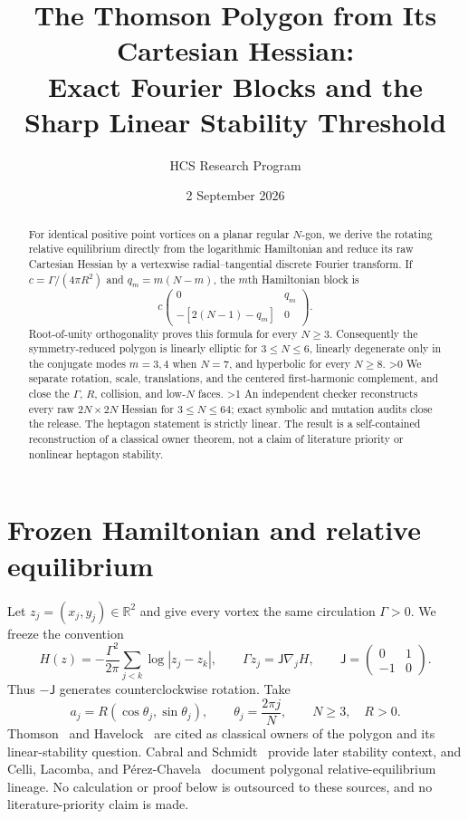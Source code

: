 \documentclass[10pt]{article}
\title{The Thomson Polygon from Its Cartesian Hessian:\\
Exact Fourier Blocks and the Sharp Linear Stability Threshold}
\author{HCS Research Program}
\date{2 September 2026}
\providecommand{\CRevisionRound}{2}
\newcommand{\R}{\mathbb R}
\newcommand{\J}{\mathsf J}
\begin{document}
\maketitle

\begin{abstract}
For identical positive point vortices on a planar regular $N$-gon, we derive
the rotating relative equilibrium directly from the logarithmic Hamiltonian
and reduce its raw Cartesian Hessian by a vertexwise radial--tangential
discrete Fourier transform.  If
$c=\Gamma/(4\pi R^2)$ and $q_m=m(N-m)$, the $m$th Hamiltonian block is
\[
 c\begin{pmatrix}0&q_m\\-[2(N-1)-q_m]&0\end{pmatrix}.
\]
Root-of-unity orthogonality proves this formula for every $N\ge3$.
Consequently the symmetry-reduced polygon is linearly elliptic for
$3\le N\le6$, linearly degenerate only in the conjugate modes $m=3,4$ when
$N=7$, and hyperbolic for every $N\ge8$.
\ifnum\CRevisionRound>0
We separate rotation, scale, translations, and the centered first-harmonic
complement, and close the $\Gamma$, $R$, collision, and low-$N$ faces.
\fi
\ifnum\CRevisionRound>1
An independent checker reconstructs every raw $2N\times2N$ Hessian for
$3\le N\le64$; exact symbolic and mutation audits close the release.
\fi
The heptagon statement is strictly linear.  The result is a self-contained
reconstruction of a classical owner theorem, not a claim of literature
priority or nonlinear heptagon stability.
\end{abstract}

\section{Frozen Hamiltonian and relative equilibrium}

Let $z_j=(x_j,y_j)\in\R^2$ and give every vortex the same circulation
$\Gamma>0$.  We freeze the convention
\begin{equation}
 H(z)=-\frac{\Gamma^2}{2\pi}\sum_{j<k}\log|z_j-z_k|,
 \qquad
 \Gamma\dot z_j=\J\nabla_jH,
 \qquad
 \J=\begin{pmatrix}0&1\\-1&0\end{pmatrix}.                 \label{eq:model}
\end{equation}
Thus $-\J$ generates counterclockwise rotation.  Take
\begin{equation}
 a_j=R(\cos\theta_j,\sin\theta_j),\qquad
 \theta_j=\frac{2\pi j}{N},\qquad N\ge3,\quad R>0.          \label{eq:polygon}
\end{equation}
Thomson~\cite{Thomson1883} and Havelock~\cite{Havelock1931} are cited as
classical owners of the polygon and its linear-stability question.
Cabral and Schmidt~\cite{CabralSchmidt2000} provide later stability context,
and Celli, Lacomba, and P\'erez-Chavela~\cite{Celli2011} document polygonal
relative-equilibrium lineage.  No calculation or proof below is outsourced
to these sources, and no literature-priority claim is made.
\end{document}
